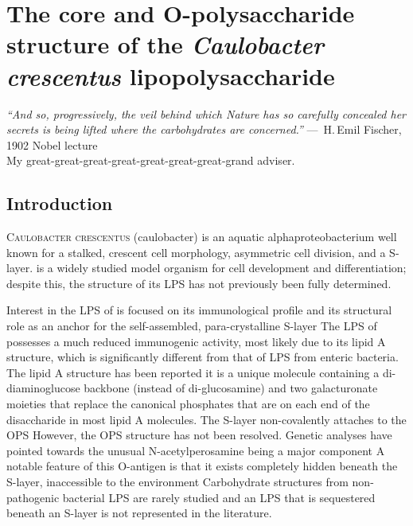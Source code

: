 \acresetall

\chapter{The core and O-polysaccharide structure of the \textit{Caulobacter crescentus} lipopolysaccharide}
\label{ch:lps}
\begin{epigraph}
  \emph{``And so, progressively, the veil behind which Nature has so carefully concealed her secrets
    is being lifted where the carbohydrates are concerned.''} ---~H.\,Emil Fischer, 1902 Nobel
  lecture\\ My great-great-great-great-great-great-great-grand adviser.
\end{epigraph}
\section{Introduction} %
\label{sec:lps_introduction} 
\lettrine[lines=2]{C}{aulobacter crescentus} (\acs{caulobacter}) is an aquatic alphaproteobacterium
well known for a stalked, crescent cell morphology, asymmetric cell division, and a
\ac{S-layer}. \caulobacter is a widely studied model organism for cell development and
differentiation; despite this, the structure of its \ac{LPS} has not previously been fully
determined.

Interest in the \ac{LPS} of \caulobacter is focused on its immunological
profile and its structural role as an anchor for the
self-assembled, para-crystalline \ac{S-layer} The \ac{LPS}
of \caulobacter possesses a much reduced immunogenic activity, most likely due
to its lipid A structure, which is significantly different from that of
\ac{LPS} from enteric bacteria. The lipid A structure has been
reported it is a unique molecule containing a
di-diaminoglucose backbone (instead of di-glucosamine) and two galacturonate
moieties that replace the canonical phosphates that are on each end of the
disaccharide in most lipid A molecules. The \caulobacter \ac{S-layer}
non-covalently attaches to the \ac{OPS} However, the
\ac{OPS} structure has not been resolved. Genetic analyses have pointed
towards the unusual N-acetylperosamine being a major
component A notable feature of this O-antigen is that it
exists completely hidden beneath the \ac{S-layer}, inaccessible to the
environment Carbohydrate structures from non-pathogenic
bacterial \ac{LPS} are rarely studied and an \ac{LPS} that is sequestered
beneath an \ac{S-layer} is not represented in the literature.
 
